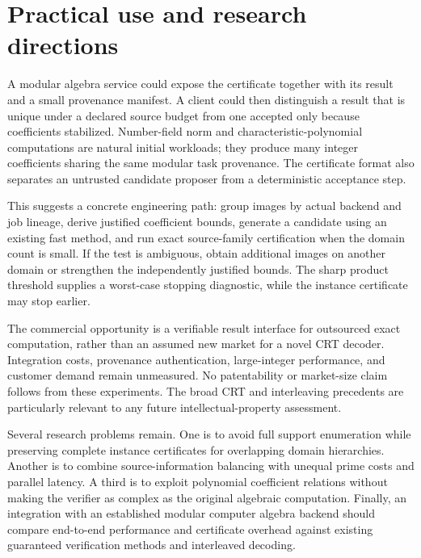 \documentclass[11pt]{article}
\theoremstyle{definition}\newtheorem{definition}[theorem]{Definition}
\begin{document}
\section{Practical use and research directions}
A modular algebra service could expose the certificate together with its result and a small provenance manifest. A client could then distinguish a result that is unique under a declared source budget from one accepted only because coefficients stabilized. Number-field norm and characteristic-polynomial computations are natural initial workloads; they produce many integer coefficients sharing the same modular task provenance. The certificate format also separates an untrusted candidate proposer from a deterministic acceptance step.

This suggests a concrete engineering path: group images by actual backend and job lineage, derive justified coefficient bounds, generate a candidate using an existing fast method, and run exact source-family certification when the domain count is small. If the test is ambiguous, obtain additional images on another domain or strengthen the independently justified bounds. The sharp product threshold supplies a worst-case stopping diagnostic, while the instance certificate may stop earlier.

The commercial opportunity is a verifiable result interface for outsourced exact computation, rather than an assumed new market for a novel CRT decoder. Integration costs, provenance authentication, large-integer performance, and customer demand remain unmeasured. No patentability or market-size claim follows from these experiments. The broad CRT and interleaving precedents are particularly relevant to any future intellectual-property assessment.

Several research problems remain. One is to avoid full support enumeration while preserving complete instance certificates for overlapping domain hierarchies. Another is to combine source-information balancing with unequal prime costs and parallel latency. A third is to exploit polynomial coefficient relations without making the verifier as complex as the original algebraic computation. Finally, an integration with an established modular computer algebra backend should compare end-to-end performance and certificate overhead against existing guaranteed verification methods and interleaved decoding.
\end{document}
